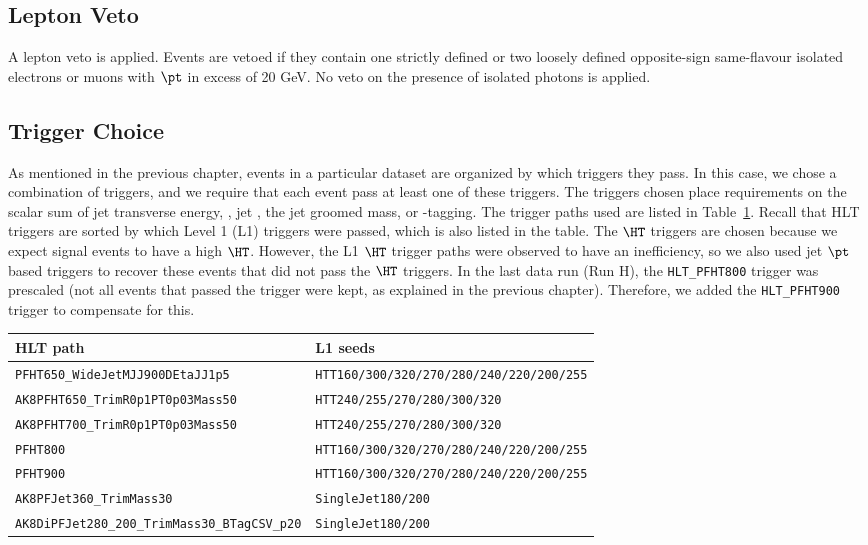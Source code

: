 \subsection{Lepton Veto}

A lepton veto is applied. Events are vetoed if they contain one strictly defined or two loosely defined opposite-sign same-flavour isolated electrons or muons with $\pt$ in excess of 20 GeV. No veto on the presence of isolated photons is applied. 

\subsection{Trigger Choice \label{ss:trigger}}

As mentioned in the previous chapter, events in a particular dataset are organized by which triggers they pass. In this case, we chose a combination of triggers, and we require that each event pass at least one of these triggers. The triggers chosen place requirements on the scalar sum of jet transverse energy, \HT, jet \pt, the jet groomed mass, or \PQb-tagging. The trigger paths used are listed in Table~\ref{tab:trigpaths}. Recall that HLT triggers are sorted by which Level 1 (L1) triggers were passed, which is also listed in the table. The $\HT$ triggers are chosen because we expect signal events to have a high $\HT$. However, the L1 $\HT$ trigger paths were observed to have an inefficiency, so we also used jet $\pt$ based triggers to recover these events that did not pass the $\HT$ triggers. In the last data run (Run H), the \texttt{HLT\_PFHT800} trigger was prescaled (not all events that passed the trigger were kept, as explained in the previous chapter). Therefore, we added the \texttt{HLT\_PFHT900} trigger to compensate for this.
\begin{table} [htbH]\tiny
  \begin{center}
    \label{tab:trigpaths}
    \begin{tabular}{l|l}
      \hline
      HLT path & L1 seeds \\
      \hline
       \texttt{PFHT650\_WideJetMJJ900DEtaJJ1p5}              & \texttt{HTT160/300/320/270/280/240/220/200/255} \\  
       \texttt{AK8PFHT650\_TrimR0p1PT0p03Mass50}             & \texttt{HTT240/255/270/280/300/320} \\  
       \texttt{AK8PFHT700\_TrimR0p1PT0p03Mass50}             & \texttt{HTT240/255/270/280/300/320} \\
       \texttt{PFHT800}                                      & \texttt{HTT160/300/320/270/280/240/220/200/255} \\  
       \texttt{PFHT900}                                      & \texttt{HTT160/300/320/270/280/240/220/200/255} \\  
       \texttt{AK8PFJet360\_TrimMass30}                      & \texttt{SingleJet180/200} \\  
       \texttt{AK8DiPFJet280\_200\_TrimMass30\_BTagCSV\_p20} & \texttt{SingleJet180/200} \\   
      \hline
    \end{tabular}
  \end{center}
\end{table}
